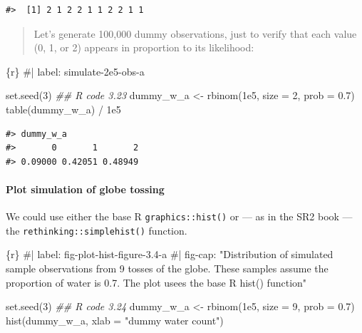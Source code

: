 \documentclass[
  letterpaper,
  DIV=11,
  numbers=noendperiod]{scrreprt}
\let\oldparagraph\paragraph
\renewcommand{\paragraph}[1]{\oldparagraph{#1}\mbox{}}
\newenvironment{Shaded}{\begin{snugshade}}{\end{snugshade}}
\newcommand{\AttributeTok}[1]{\textcolor[rgb]{0.40,0.45,0.13}{#1}}
\newcommand{\CommentTok}[1]{\textcolor[rgb]{0.37,0.37,0.37}{#1}}
\newcommand{\DecValTok}[1]{\textcolor[rgb]{0.68,0.00,0.00}{#1}}
\newcommand{\DocumentationTok}[1]{\textcolor[rgb]{0.37,0.37,0.37}{\textit{#1}}}
\newcommand{\FloatTok}[1]{\textcolor[rgb]{0.68,0.00,0.00}{#1}}
\newcommand{\FunctionTok}[1]{\textcolor[rgb]{0.28,0.35,0.67}{#1}}
\newcommand{\InformationTok}[1]{\textcolor[rgb]{0.37,0.37,0.37}{#1}}
\newcommand{\NormalTok}[1]{\textcolor[rgb]{0.00,0.23,0.31}{#1}}
\newcommand{\OtherTok}[1]{\textcolor[rgb]{0.00,0.23,0.31}{#1}}
\newcommand{\SpecialCharTok}[1]{\textcolor[rgb]{0.37,0.37,0.37}{#1}}
\newcommand{\StringTok}[1]{\textcolor[rgb]{0.13,0.47,0.30}{#1}}
\begin{document}
\begin{verbatim}
#>  [1] 2 1 2 2 1 1 2 2 1 1
\end{verbatim}

\begin{quote}
Let's generate 100,000 dummy observations, just to verify that each
value (0, 1, or 2) appears in proportion to its likelihood:
\end{quote}

\begin{Shaded}
\begin{Highlighting}[]
\InformationTok{\textasciigrave{}\textasciigrave{}\textasciigrave{}\{r\}}
\CommentTok{\#| label: simulate{-}2e5{-}obs{-}a}

\FunctionTok{set.seed}\NormalTok{(}\DecValTok{3}\NormalTok{)}
\DocumentationTok{\#\# R code 3.23}
\NormalTok{dummy\_w\_a }\OtherTok{\textless{}{-}} \FunctionTok{rbinom}\NormalTok{(}\FloatTok{1e5}\NormalTok{, }\AttributeTok{size =} \DecValTok{2}\NormalTok{, }\AttributeTok{prob =} \FloatTok{0.7}\NormalTok{)}
\FunctionTok{table}\NormalTok{(dummy\_w\_a) }\SpecialCharTok{/} \FloatTok{1e5}
\InformationTok{\textasciigrave{}\textasciigrave{}\textasciigrave{}}
\end{Highlighting}
\end{Shaded}

\begin{verbatim}
#> dummy_w_a
#>       0       1       2 
#> 0.09000 0.42051 0.48949
\end{verbatim}

\hypertarget{plot-simulation-of-globe-tossing}{%
\paragraph{Plot simulation of globe
tossing}\label{plot-simulation-of-globe-tossing}}

We could use either the base R \texttt{graphics::hist()} or --- as in
the SR2 book --- the \texttt{rethinking::simplehist()} function.

\begin{Shaded}
\begin{Highlighting}[]
\InformationTok{\textasciigrave{}\textasciigrave{}\textasciigrave{}\{r\}}
\CommentTok{\#| label: fig{-}plot{-}hist{-}figure{-}3.4{-}a}
\CommentTok{\#| fig{-}cap: "Distribution of simulated sample observations from 9 tosses of the globe. These samples assume the proportion of water is 0.7. The plot usees the base R \textasciigrave{}hist()\textasciigrave{} function"}

\FunctionTok{set.seed}\NormalTok{(}\DecValTok{3}\NormalTok{)}
\DocumentationTok{\#\# R code 3.24}
\NormalTok{dummy\_w\_a }\OtherTok{\textless{}{-}} \FunctionTok{rbinom}\NormalTok{(}\FloatTok{1e5}\NormalTok{, }\AttributeTok{size =} \DecValTok{9}\NormalTok{, }\AttributeTok{prob =} \FloatTok{0.7}\NormalTok{)}
\FunctionTok{hist}\NormalTok{(dummy\_w\_a, }\AttributeTok{xlab =} \StringTok{"dummy water count"}\NormalTok{)}
\InformationTok{\textasciigrave{}\textasciigrave{}\textasciigrave{}}
\end{Highlighting}
\end{Shaded}
\end{document}
